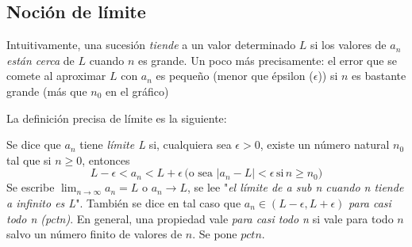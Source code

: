 \documentclass[../Teoría.root.tex]{subfiles}
\begin{document}
\subsection{Noción de límite}
Intuitivamente, una sucesión \textit{tiende} a un valor determinado \(L\) si los valores de \(a_n\) \textit{están cerca} de \(L\) cuando \(n\) es grande.
Un poco más precisamente:
el error que se comete al aproximar \(L\) con \(a_n\) es pequeño (menor que épsilon (\(\epsilon\))) si \(n\) es bastante grande (más que \(n_0\) en el gráfico)
\begin{center}
    \begin{scaletikzpicturetowidth}{\linewidth}
    \end{scaletikzpicturetowidth}
\end{center}
La definición precisa de límite es la siguiente:

Se dice que \(a_n\) tiene \textit{límite L} si, cualquiera sea \(\epsilon>0\), existe un número natural \(n_0\) tal que si \(n\geq0\), entonces \[L-\epsilon<a_n<L+\epsilon\,\text{(o sea \(|a_n-L|<\epsilon\,\text{si}\,n\geq n_0\))}\]
Se escribe \(\lim_{n\to\infty}a_n=L\) o \(a_n\rightarrow L\), se lee "\textit{el límite de a sub n cuando n tiende a infinito es L}".
También se dice en tal caso que \(a_n\in(L-\epsilon,L+\epsilon)\) \textit{para casi todo n (pctn)}.
En general, una propiedad vale \textit{para casi todo n} si vale para todo \(n\) salvo un número finito de valores de \(n\).
Se pone \(pctn\).
\end{document}
